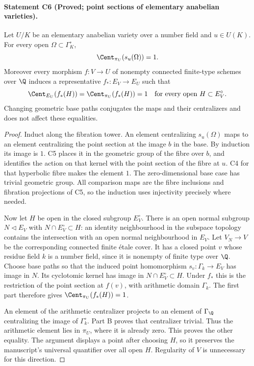 \paragraph{Statement C6 (Proved; point sections of elementary anabelian varieties).}\label{res:C6}
Let $U/K$ be an elementary anabelian variety over a number field and $u\in U(K)$. For every open $\Omega\subset\Gamma_K^\circ$,
\[
 \Cent_{\pi_U}(s_u(\Omega))=1.
\]
Moreover every morphism $f:V\to U$ of nonempty connected finite-type schemes over $\Q$ induces a representative $f_*:E_V\to E_U$ such that
\[
 \Cent_{E_U}(f_*(H))=\Cent_{\pi_U}(f_*(H))=1
 \quad\text{for every open }H\subset E_V^\circ.
\]
Changing geometric base paths conjugates the maps and their centralizers and does not affect these equalities.
\begin{proof}
Induct along the fibration tower. An element centralizing $s_u(\Omega)$ maps to an element centralizing the point section at the image $b$ in the base. By induction its image is $1$. C5 places it in the geometric group of the fibre over $b$, and identifies the action on that kernel with the point section of the fibre at $u$. C4 for that hyperbolic fibre makes the element $1$. The zero-dimensional base case has trivial geometric group. All comparison maps are the fibre inclusions and fibration projections of C5, so the induction uses injectivity precisely where needed.

Now let $H$ be open in the closed subgroup $E_V^\circ$. There is an open normal subgroup $N\triangleleft E_V$ with $N\cap E_V^\circ\subset H$: an identity neighbourhood in the subspace topology contains the intersection with an open normal neighbourhood in $E_V$. Let $V_N\to V$ be the corresponding connected finite étale cover. It has a closed point $v$ whose residue field $k$ is a number field, since it is nonempty of finite type over $\Q$. Choose base paths so that the induced point homomorphism $s_v:\Gamma_k\to E_V$ has image in $N$. Its cyclotomic kernel has image in $N\cap E_V^\circ\subset H$. Under $f_*$ this is the restriction of the point section at $f(v)$, with arithmetic domain $\Gamma_k$. The first part therefore gives $\Cent_{\pi_U}(f_*(H))=1$.

An element of the arithmetic centralizer projects to an element of $\Gamma_\Q$ centralizing the image of $\Gamma_k^\circ$. Part B proves that centralizer trivial. Thus the arithmetic element lies in $\pi_U$, where it is already zero. This proves the other equality. The argument displays a point after choosing $H$, so it preserves the manuscript's universal quantifier over all open $H$. Regularity of $V$ is unnecessary for this direction.
\end{proof}

